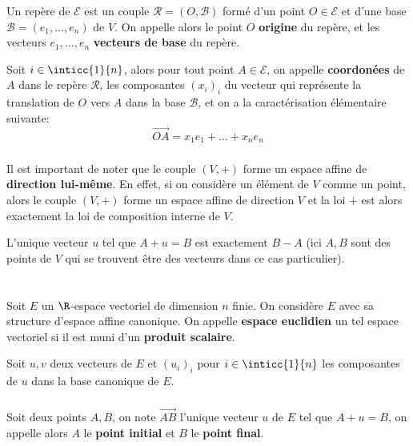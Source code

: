 \subsection*{}
Un repère de \(\mathscr{E}\) est un couple \(\mathscr{R} = (O, \mathscr{B})\) formé d'un point \(O \in \mathscr{E}\) et d'une base \(\mathscr{B} = (e_1, \ldots, e_n)\) de \(V\). On appelle alors le point \(O\) \textbf{origine} du repère, et les vecteurs \(e_1, \ldots, e_n\) \textbf{vecteurs de base} du repère.\<

Soit \(i\in\inticc{1}{n}\), alors pour tout point \(A \in \mathscr{E}\), on appelle \textbf{coordonées} de \(A\) dans le repère \(\mathscr{R}\), les composantes \((x_i)_i\) du vecteur qui représente la translation de \(O\) vers \(A\) dans la base \(\mathscr{B}\), et on a la caractérisation élémentaire suivante:
\[
   \overrightarrow{OA} = x_1e_1 + \ldots + x_ne_n 
\]

\subsection*{}
Il est important de noter que le couple \((V, +)\) forme un espace affine de \textbf{direction lui-même}. En effet, si on considère un élément de \(V\) comme un point, alors le couple  \((V, +)\) forme un espace affine de direction \(V\) et la loi \(+\) est alors exactement la loi de composition interne de \(V\).\<

L'unique vecteur \(u\) tel que \(A + u = B\) est exactement \(B - A\) (ici \(A, B\) sont des points de \(V\) qui se trouvent être des vecteurs dans ce cas particulier). \<\<


\chapter*{}
Soit \(E\) un \(\R\)-espace vectoriel de dimension \(n\) finie. On considère \(E\) avec sa structure d'espace affine canonique.
On appelle \textbf{espace euclidien} un tel espace vectoriel si il est muni d'un \textbf{produit scalaire}.\<

Soit \(u, v\) deux vecteurs de \(E\) et \((u_i)_i\) pour \(i \in \inticc{1}{n}\) les composantes de \(u\) dans la base canonique de \(E\).

\subsection*{}
Soit deux points \(A, B\), on note \(\overrightarrow{AB}\) l'unique vecteur \(u\) de \(E\) tel que \(A + u = B\), on appelle alors \(A\) le \textbf{point initial} et \(B\) le \textbf{point final}. \<

